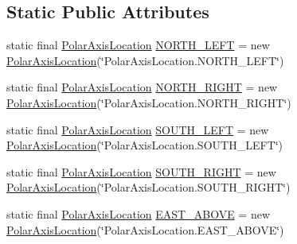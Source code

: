 \subsection*{Static Public Attributes}
\begin{DoxyCompactItemize}
\item 
static final \mbox{\hyperlink{classorg_1_1jfree_1_1chart_1_1plot_1_1_polar_axis_location}{Polar\+Axis\+Location}} \mbox{\hyperlink{classorg_1_1jfree_1_1chart_1_1plot_1_1_polar_axis_location_a021dddba36c2f0053f5e9b170f12debd}{N\+O\+R\+T\+H\+\_\+\+L\+E\+FT}} = new \mbox{\hyperlink{classorg_1_1jfree_1_1chart_1_1plot_1_1_polar_axis_location}{Polar\+Axis\+Location}}(\char`\"{}Polar\+Axis\+Location.\+N\+O\+R\+T\+H\+\_\+\+L\+E\+FT\char`\"{})
\item 
static final \mbox{\hyperlink{classorg_1_1jfree_1_1chart_1_1plot_1_1_polar_axis_location}{Polar\+Axis\+Location}} \mbox{\hyperlink{classorg_1_1jfree_1_1chart_1_1plot_1_1_polar_axis_location_a3da96555009c9d7081791cbc3c7be6e2}{N\+O\+R\+T\+H\+\_\+\+R\+I\+G\+HT}} = new \mbox{\hyperlink{classorg_1_1jfree_1_1chart_1_1plot_1_1_polar_axis_location}{Polar\+Axis\+Location}}(\char`\"{}Polar\+Axis\+Location.\+N\+O\+R\+T\+H\+\_\+\+R\+I\+G\+HT\char`\"{})
\item 
static final \mbox{\hyperlink{classorg_1_1jfree_1_1chart_1_1plot_1_1_polar_axis_location}{Polar\+Axis\+Location}} \mbox{\hyperlink{classorg_1_1jfree_1_1chart_1_1plot_1_1_polar_axis_location_a7c74ee560746b18009f905d9d2553264}{S\+O\+U\+T\+H\+\_\+\+L\+E\+FT}} = new \mbox{\hyperlink{classorg_1_1jfree_1_1chart_1_1plot_1_1_polar_axis_location}{Polar\+Axis\+Location}}(\char`\"{}Polar\+Axis\+Location.\+S\+O\+U\+T\+H\+\_\+\+L\+E\+FT\char`\"{})
\item 
static final \mbox{\hyperlink{classorg_1_1jfree_1_1chart_1_1plot_1_1_polar_axis_location}{Polar\+Axis\+Location}} \mbox{\hyperlink{classorg_1_1jfree_1_1chart_1_1plot_1_1_polar_axis_location_a3b82dceb752faf0c038fe4f1d0b7eb92}{S\+O\+U\+T\+H\+\_\+\+R\+I\+G\+HT}} = new \mbox{\hyperlink{classorg_1_1jfree_1_1chart_1_1plot_1_1_polar_axis_location}{Polar\+Axis\+Location}}(\char`\"{}Polar\+Axis\+Location.\+S\+O\+U\+T\+H\+\_\+\+R\+I\+G\+HT\char`\"{})
\item 
static final \mbox{\hyperlink{classorg_1_1jfree_1_1chart_1_1plot_1_1_polar_axis_location}{Polar\+Axis\+Location}} \mbox{\hyperlink{classorg_1_1jfree_1_1chart_1_1plot_1_1_polar_axis_location_a189d1e3c68d95d0e40521d07eca67cb9}{E\+A\+S\+T\+\_\+\+A\+B\+O\+VE}} = new \mbox{\hyperlink{classorg_1_1jfree_1_1chart_1_1plot_1_1_polar_axis_location}{Polar\+Axis\+Location}}(\char`\"{}Polar\+Axis\+Location.\+E\+A\+S\+T\+\_\+\+A\+B\+O\+VE\char`\"{})

\end{DoxyCompactItemize}
